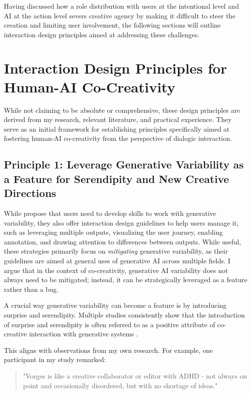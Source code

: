Having discussed how a role distribution with users at the intentional level and AI at the action level severs creative agency by making it difficult to steer the creation and limiting user involvement, the following sections will outline interaction design principles aimed at addressing these challenges.

\section{Interaction Design Principles for Human-AI Co-Creativity}

While not claiming to be absolute or comprehensive, these design principles are derived from my research, relevant literature, and practical experience. They serve as an initial framework for establishing principles specifically aimed at fostering human-AI co-creativity from the perspective of dialogic interaction.

\subsection{Principle 1: Leverage Generative Variability as a Feature for Serendipity and New Creative Directions}

While \cite{Weisz2024-io} propose that users need to develop skills to work with generative variability, they also offer interaction design guidelines to help users manage it, such as leveraging multiple outputs, visualizing the user journey, enabling annotation, and drawing attention to differences between outputs. While useful, these strategies primarily focus on \textit{mitigating} generative variability, as their guidelines are aimed at general uses of generative AI across multiple fields. I argue that in the context of co-creativity, generative AI variability does not always need to be mitigated; instead, it can be strategically leveraged as a feature rather than a bug.

A crucial way generative variability can become a feature is by introducing surprise and serendipity. Multiple studies consistently show that the introduction of surprise and serendipity is often referred to as a positive attribute of co-creative interaction with generative systems \cite{Lawton2023-tb, Chiou2023-vr, Louie2020-aq, Moruzzi2022-gp, Park2024-gw, Koch2020-gx}.

This aligns with observations from my own research. For example, one participant in my study remarked:

\begin{quote}
"Vorges is like a creative collaborator or editor with ADHD - not always on point and occasionally disordered, but with no shortage of ideas."
\end{quote}

